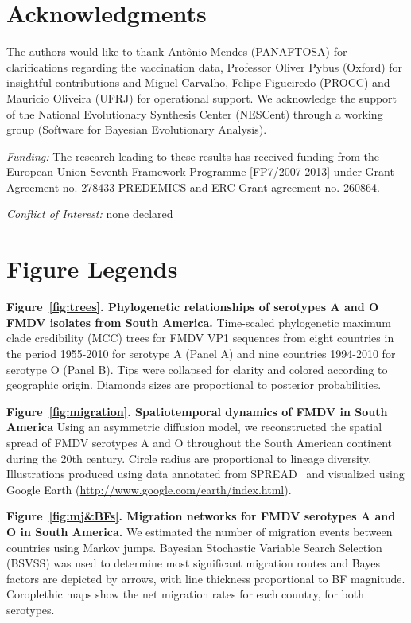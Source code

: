 \documentclass[10pt]{article}
\begin{document}
\section*{Acknowledgments}
The authors would like to thank Ant\^onio Mendes (PANAFTOSA) for clarifications regarding the vaccination data, Professor Oliver Pybus (Oxford) for insightful contributions and Miguel Carvalho, Felipe Figueiredo (PROCC) and Mauricio Oliveira (UFRJ) for operational support.
We acknowledge the support of the National Evolutionary Synthesis Center (NESCent) through a working group (Software for Bayesian Evolutionary Analysis).

\emph{Funding:} The research leading to these results has received funding from the European Union Seventh Framework Programme [FP7/2007-2013] under Grant Agreement no. 278433-PREDEMICS and ERC Grant agreement no. 260864.

\emph{Conflict of Interest:} none declared

\newpage

\newpage
\section*{Figure Legends}

{\bf Figure~\ref{fig:trees}. Phylogenetic relationships of serotypes A and O FMDV isolates from South America.} Time-scaled phylogenetic maximum clade credibility (MCC) trees for FMDV VP1 sequences from eight countries in the period 1955-2010 for serotype A (Panel A) and nine countries 1994-2010 for serotype O (Panel B).
Tips were collapsed for clarity and colored according to geographic origin.
Diamonds sizes are proportional to posterior probabilities.

{\bf Figure~\ref{fig:migration}. Spatiotemporal dynamics of FMDV in South America} Using an asymmetric diffusion model, we reconstructed the spatial spread of FMDV serotypes A and O throughout the South American continent during the 20th century.
Circle radius are proportional to lineage diversity.
Illustrations produced using data annotated from SPREAD~\cite{spread} and visualized using Google Earth (\url{http://www.google.com/earth/index.html}).

{\bf Figure~\ref{fig:mj&BFs}. Migration networks for FMDV serotypes A and O in South America.} We estimated the number of migration events between countries using Markov jumps.
Bayesian Stochastic Variable Search Selection (BSVSS) was used to determine most significant migration routes and Bayes factors are depicted by arrows, with line thickness proportional to BF magnitude.
Coroplethic maps show the net migration rates for each country, for both serotypes.
\end{document}
